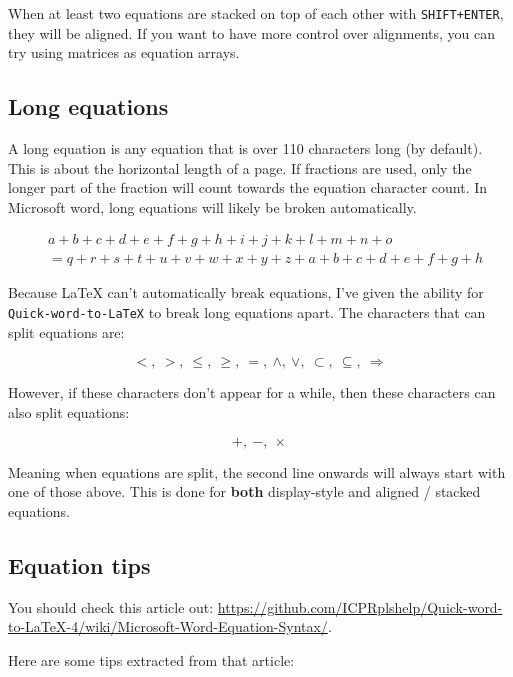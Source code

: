 \documentclass[
]{article}
\theoremstyle{plain}
\theoremstyle{remark}
\theoremstyle{definition}
\begin{document}
When at least two equations are stacked on top of each other with
\texttt{SHIFT+ENTER}, they will be aligned. If you want to have more
control over alignments, you can try using matrices as equation arrays.


\subsection{Long equations}

A long equation is any equation that is over 110 characters long (by
default). This is about the horizontal length of a page. If fractions
are used, only the longer part of the fraction will count towards the
equation character count. In Microsoft word, long equations will likely
be broken automatically.

\begin{align*}
&a + b + c + d + e + f + g + h + i + j + k + l + m + n + o  \\
&= q + r + s + t + u + v + w + x + y + z + a + b + c + d + e + f + g + h
\end{align*}


Because LaTeX can't automatically break equations, I've given the
ability for \texttt{Quick-word-to-LaTeX} to break long equations apart.
The characters that can split equations are:

\[< ,\  > ,\  \leq ,\  \geq ,\  = ,\  \land ,\  \vee ,\  \subset ,\  \subseteq ,\  \Rightarrow\]

However, if these characters don't appear for a while, then these
characters can also split equations:

\[+ ,\  - ,\  \times\]

Meaning when equations are split, the second line onwards will always
start with one of those above. This is done for \textbf{both}
display-style and aligned / stacked equations.


\subsection{Equation tips}

You should check this article out:
\href{https://github.com/ICPRplshelp/Quick-word-to-LaTeX-4/wiki/Microsoft-Word-Equation-Syntax}{https://github.com/ICPRplshelp/Quick-word-to-LaTeX-4/wiki/Microsoft-Word-Equation-Syntax/}.

Here are some tips extracted from that article:
\end{document}
